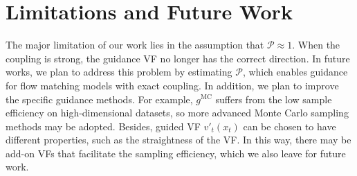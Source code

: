 \section{Limitations and Future Work}\label{app:limitations}

The major limitation of our work lies in the assumption that $\mathcal{P}\approx 1$. When the coupling is strong, the guidance VF no longer has the correct direction. 
In future works, we plan to address this problem by estimating $\mathcal{P}$, which enables guidance for flow matching models with exact coupling. 
In addition, we plan to improve the specific guidance methods. For example, $g^{\text{MC}}$ suffers from the low sample efficiency on high-dimensional datasets, so more advanced Monte Carlo sampling methods may be adopted. 
Besides, guided VF $v'_t(x_t)$ can be chosen to have different properties, such as the straightness of the VF. In this way, there may be add-on VFs that facilitate the sampling efficiency, which we also leave for future work. 

